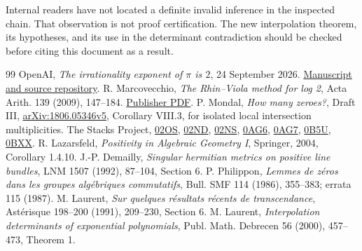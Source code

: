 \documentclass[11pt]{article}
\theoremstyle{definition}
\theoremstyle{remark}
\numberwithin{equation}{section}
\begin{document}
Internal readers have not located a definite invalid inference in the
inspected chain. That observation is not proof certification. The new
interpolation theorem, its hypotheses, and its use in the determinant
contradiction should be checked before citing this document as a result.

\clearpage
\begin{thebibliography}{99}
 OpenAI, \emph{The irrationality exponent of $\pi$ is $2$},
24 September 2026. \href{https://github.com/openai/math/blob/main/preprints/The-irrationality-exponent-of-pi-is-2-September-24-2026/paper.pdf}{Manuscript and source repository}.
 R. Marcovecchio, \emph{The Rhin--Viola method for log 2},
Acta Arith. 139 (2009), 147--184.
\href{https://www.impan.pl/shop/en/publication/transaction/download/product/82234}{Publisher PDF}.
 P. Mondal, \emph{How many zeroes?}, Draft III,
\href{https://arxiv.org/abs/1806.05346v5}{arXiv:1806.05346v5},
Corollary VIII.3, for isolated local intersection multiplicities.
 The Stacks Project,
\href{https://stacks.math.columbia.edu/tag/02OS}{02OS},
\href{https://stacks.math.columbia.edu/tag/02ND}{02ND},
\href{https://stacks.math.columbia.edu/tag/02NS}{02NS},
\href{https://stacks.math.columbia.edu/tag/0AG6}{0AG6},
\href{https://stacks.math.columbia.edu/tag/0AG7}{0AG7},
\href{https://stacks.math.columbia.edu/tag/0B5U}{0B5U},
\href{https://stacks.math.columbia.edu/tag/0BXX}{0BXX}.
 R. Lazarsfeld, \emph{Positivity in Algebraic Geometry I},
Springer, 2004, Corollary 1.4.10.
 J.-P. Demailly, \emph{Singular hermitian metrics on positive
line bundles}, LNM 1507 (1992), 87--104, Section 6.
 P. Philippon, \emph{Lemmes de z\'eros dans les groupes
alg\'ebriques commutatifs}, Bull. SMF 114 (1986), 355--383; errata 115 (1987).
 M. Laurent, \emph{Sur quelques r\'esultats r\'ecents de
transcendance}, Ast\'erisque 198--200 (1991), 209--230, Section 6.
 M. Laurent, \emph{Interpolation determinants of exponential
polynomials}, Publ. Math. Debrecen 56 (2000), 457--473, Theorem 1.
\end{thebibliography}
\end{document}
